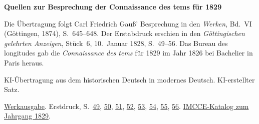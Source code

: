 \clearpage\thispagestyle{empty}
\begin{center}\Large\bfseries Quellen zur Besprechung der Connaissance des tems für 1829\end{center}

Die Übertragung folgt Carl Friedrich Gauß’ Besprechung in den \emph{Werken}, Bd.~VI (Göttingen, 1874), S.~645--648. Der Erstabdruck erschien in den \emph{Göttingischen gelehrten Anzeigen}, Stück~6, 10.~Januar 1828, S.~49--56. Das Bureau des longitudes gab die \emph{Connaissance des tems} für 1829 im Jahr 1826 bei Bachelier in Paris heraus.

KI-Übertragung aus dem historischen Deutsch in modernes Deutsch. KI-erstellter Satz.

\href{https://gdz.sub.uni-goettingen.de/id/PPN236007467}{Werkausgabe}. Erstdruck, S.~\href{https://images.p.sub.uni-goettingen.de/iiif/image/gdz:PPN385030444_1828_1:00000051/full/1650,/0/default.jpg}{49}, \href{https://images.p.sub.uni-goettingen.de/iiif/image/gdz:PPN385030444_1828_1:00000052/full/1650,/0/default.jpg}{50}, \href{https://images.p.sub.uni-goettingen.de/iiif/image/gdz:PPN385030444_1828_1:00000053/full/1650,/0/default.jpg}{51}, \href{https://images.p.sub.uni-goettingen.de/iiif/image/gdz:PPN385030444_1828_1:00000054/full/1650,/0/default.jpg}{52}, \href{https://images.p.sub.uni-goettingen.de/iiif/image/gdz:PPN385030444_1828_1:00000055/full/1650,/0/default.jpg}{53}, \href{https://images.p.sub.uni-goettingen.de/iiif/image/gdz:PPN385030444_1828_1:00000056/full/1650,/0/default.jpg}{54}, \href{https://images.p.sub.uni-goettingen.de/iiif/image/gdz:PPN385030444_1828_1:00000057/full/1650,/0/default.jpg}{55}, \href{https://images.p.sub.uni-goettingen.de/iiif/image/gdz:PPN385030444_1828_1:00000058/full/1650,/0/default.jpg}{56}. \href{https://cdt.imcce.fr/items/show/178}{IMCCE-Katalog zum Jahrgang 1829}.

\clearpage
